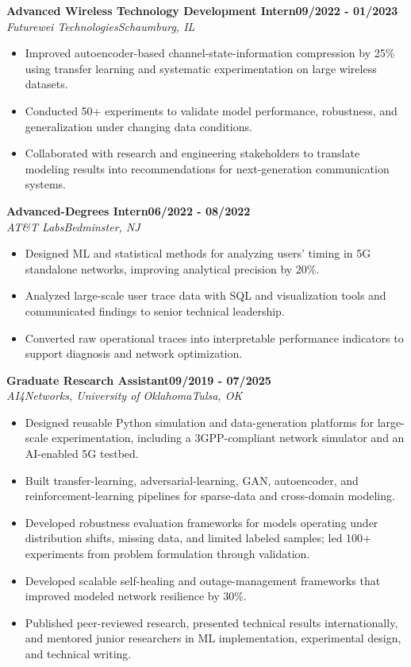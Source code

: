\documentclass[9pt,letterpaper]{extarticle}
\newcommand{\role}[4]{%
  \Needspace{4\baselineskip}\textbf{#1}\hfill\textbf{#2}\\[-1pt]
  \textit{#3}\hfill\textit{#4}\par}
\begin{document}
\role{Advanced Wireless Technology Development Intern}{09/2022 - 01/2023}{Futurewei Technologies}{Schaumburg, IL}
\begin{itemize}
\item Improved autoencoder-based channel-state-information compression by 25\% using transfer learning and systematic experimentation on large wireless datasets.
\item Conducted 50+ experiments to validate model performance, robustness, and generalization under changing data conditions.
\item Collaborated with research and engineering stakeholders to translate modeling results into recommendations for next-generation communication systems.
\end{itemize}
\role{Advanced-Degrees Intern}{06/2022 - 08/2022}{AT\&T Labs}{Bedminster, NJ}
\begin{itemize}
\item Designed ML and statistical methods for analyzing users' timing in 5G standalone networks, improving analytical precision by 20\%.
\item Analyzed large-scale user trace data with SQL and visualization tools and communicated findings to senior technical leadership.
\item Converted raw operational traces into interpretable performance indicators to support diagnosis and network optimization.
\end{itemize}
\role{Graduate Research Assistant}{09/2019 - 07/2025}{AI4Networks, University of Oklahoma}{Tulsa, OK}
\begin{itemize}
\item Designed reusable Python simulation and data-generation platforms for large-scale experimentation, including a 3GPP-compliant network simulator and an AI-enabled 5G testbed.
\item Built transfer-learning, adversarial-learning, GAN, autoencoder, and reinforcement-learning pipelines for sparse-data and cross-domain modeling.
\item Developed robustness evaluation frameworks for models operating under distribution shifts, missing data, and limited labeled samples; led 100+ experiments from problem formulation through validation.
\item Developed scalable self-healing and outage-management frameworks that improved modeled network resilience by 30\%.
\item Published peer-reviewed research, presented technical results internationally, and mentored junior researchers in ML implementation, experimental design, and technical writing.
\end{itemize}
\end{document}
